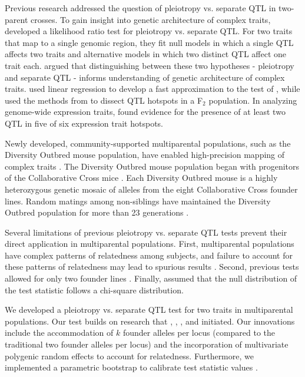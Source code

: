 \documentclass[12pt,twoside, lineno]{gsajnl}
\begin{document}
Previous research addressed the question of pleiotropy vs. separate QTL in two-parent crosses. To gain insight into genetic architecture of complex traits, \citet{jiang1995multiple} developed a likelihood ratio test for pleiotropy vs. separate QTL. For two traits that map to a single genomic region, they fit null models in which a single QTL affects two traits and alternative models in which two distinct QTL affect one trait each.  \citet{jiang1995multiple} argued that distinguishing between these two hypotheses - pleiotropy and separate QTL - informs understanding of genetic architecture of complex traits. \citet{knott2000multitrait} used linear regression to develop a fast approximation to the test of \citet{jiang1995multiple}, while \citet{tian2016dissection} used the methods from \citet{knott2000multitrait} to dissect QTL hotspots in a F$_2$ population. In analyzing genome-wide expression traits, \citet{tian2016dissection} found evidence for the presence of at least two QTL in five of six expression trait hotspots.


Newly developed, community-supported multiparental populations, such as the Diversity Outbred mouse population, have enabled high-precision mapping of complex traits \citep{de2014genetics}. The Diversity Outbred mouse population began with progenitors of the Collaborative Cross mice \citep{churchill2004collaborative,churchill2012diversity}. Each Diversity Outbred mouse is a highly heterozygous genetic mosaic of alleles from the eight Collaborative Cross founder lines. Random matings among non-siblings have maintained the Diversity Outbred population for more than 23 generations \citep{chesler2016diversity}. 


Several limitations of previous pleiotropy vs. separate QTL tests prevent their direct application in multiparental populations. First, multiparental populations have complex patterns of relatedness among subjects, and failure to account for these patterns of relatedness may lead to spurious results \citep{yang2014advantages}. Second, previous tests allowed for only two founder lines \citep{jiang1995multiple}. Finally, \citet{jiang1995multiple} assumed that the null distribution of the test statistic follows a chi-square distribution.  

We developed a pleiotropy vs. separate QTL test for two traits in multiparental populations. Our test builds on research that \citet{jiang1995multiple}, \citet{knott2000multitrait}, \citet{tian2016dissection}, and \citet{zhou2014efficient} initiated. Our innovations include the accommodation of $k$ founder alleles per locus (compared to the traditional two founder alleles per locus) and the incorporation of multivariate polygenic random effects to account for relatedness. Furthermore, we implemented a parametric bootstrap to calibrate test statistic values \citep{efron1979,tian2016dissection}. 
\end{document}
